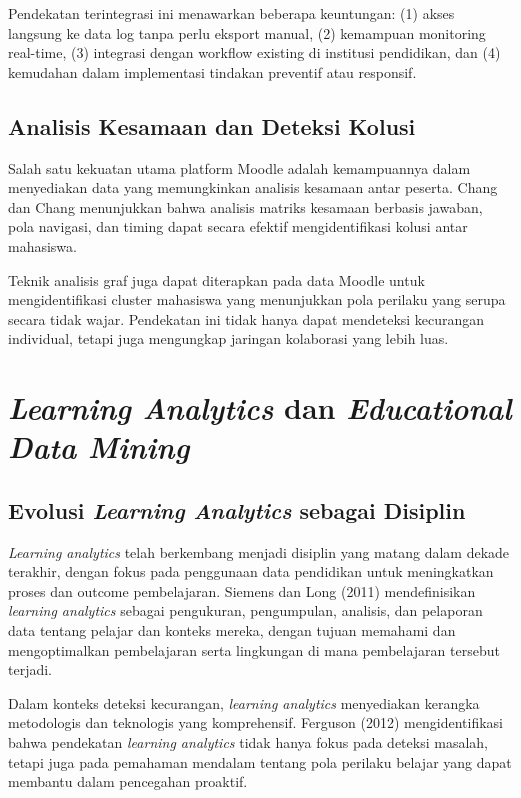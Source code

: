 Pendekatan terintegrasi ini menawarkan beberapa keuntungan: (1) akses langsung ke data log tanpa perlu eksport manual, (2) kemampuan monitoring real-time, (3) integrasi dengan workflow existing di institusi pendidikan, dan (4) kemudahan dalam implementasi tindakan preventif atau responsif.

\subsection{Analisis Kesamaan dan Deteksi Kolusi}

Salah satu kekuatan utama platform Moodle adalah kemampuannya dalam menyediakan data yang memungkinkan analisis kesamaan antar peserta. Chang dan Chang \cite{Chang2023} menunjukkan bahwa analisis matriks kesamaan berbasis jawaban, pola navigasi, dan timing dapat secara efektif mengidentifikasi kolusi antar mahasiswa.

Teknik analisis graf juga dapat diterapkan pada data Moodle untuk mengidentifikasi cluster mahasiswa yang menunjukkan pola perilaku yang serupa secara tidak wajar. Pendekatan ini tidak hanya dapat mendeteksi kecurangan individual, tetapi juga mengungkap jaringan kolaborasi yang lebih luas.

\section{\textit{Learning Analytics} dan \textit{Educational Data Mining}}
\label{sec:learningAnalytics}

\subsection{Evolusi \textit{Learning Analytics} sebagai Disiplin}

\textit{Learning analytics} telah berkembang menjadi disiplin yang matang dalam dekade terakhir, dengan fokus pada penggunaan data pendidikan untuk meningkatkan proses dan outcome pembelajaran. Siemens dan Long (2011) mendefinisikan \textit{learning analytics} sebagai pengukuran, pengumpulan, analisis, dan pelaporan data tentang pelajar dan konteks mereka, dengan tujuan memahami dan mengoptimalkan pembelajaran serta lingkungan di mana pembelajaran tersebut terjadi.

Dalam konteks deteksi kecurangan, \textit{learning analytics} menyediakan kerangka metodologis dan teknologis yang komprehensif. Ferguson (2012) mengidentifikasi bahwa pendekatan \textit{learning analytics} tidak hanya fokus pada deteksi masalah, tetapi juga pada pemahaman mendalam tentang pola perilaku belajar yang dapat membantu dalam pencegahan proaktif.

